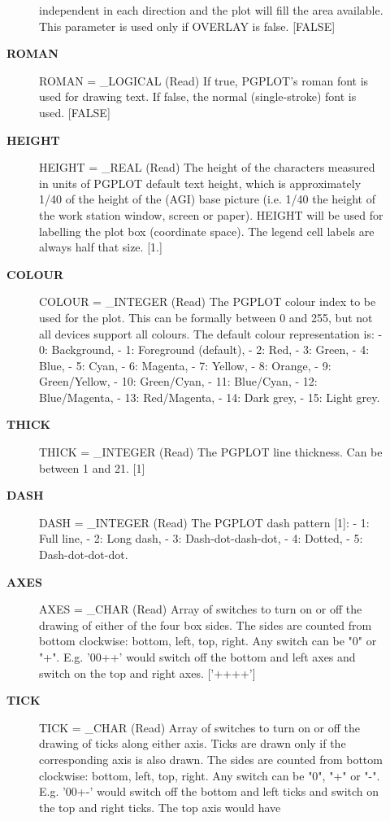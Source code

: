 \begin{description}
\begin{description}
   independent in each direction and the plot will fill the area
   available. This parameter is used only if OVERLAY is false. [FALSE]
\item [{\bf ROMAN}]
ROMAN = _LOGICAL (Read)
   If true, PGPLOT's roman font is used for drawing text. If
   false, the normal (single-stroke) font is used. [FALSE]
\item [{\bf HEIGHT}]
HEIGHT = _REAL (Read)
   The height of the characters measured in units of PGPLOT
   default text height, which is approximately 1/40 of the height
   of the (AGI) base picture (i.e. 1/40 the height of the
   work station window, screen or paper). HEIGHT will be used for
   labelling the plot box (coordinate space). The legend cell
   labels are always half that size. [1.]
\item [{\bf COLOUR}]
COLOUR = _INTEGER (Read)
   The PGPLOT colour index to be used for the plot. This can be
   formally between 0 and 255, but not all devices support all
   colours. The default colour representation is:
   -  0: Background,           -  1: Foreground (default),
   -  2: Red,                  -  3: Green,
   -  4: Blue,                 -  5: Cyan,
   -  6: Magenta,              -  7: Yellow,
   -  8: Orange,               -  9: Green/Yellow,
   - 10: Green/Cyan,           - 11: Blue/Cyan,
   - 12: Blue/Magenta,         - 13: Red/Magenta,
   - 14: Dark grey,            - 15: Light grey.
\item [{\bf THICK}]
THICK = _INTEGER (Read)
   The PGPLOT line thickness. Can be between 1 and 21. [1]
\item [{\bf DASH}]
DASH = _INTEGER (Read)
   The PGPLOT dash pattern [1]:
   -  1: Full line,
   -  2: Long dash,
   -  3: Dash-dot-dash-dot,
   -  4: Dotted,
   -  5: Dash-dot-dot-dot.
\item [{\bf AXES}]
AXES = _CHAR (Read)
   Array of switches to turn on or off the drawing of either of
   the four box sides. The sides are counted from bottom
   clockwise: bottom, left, top, right. Any switch can be "0" or
   "+". E.g. '00++' would switch off the bottom and left axes and
   switch on the top and right axes. ['++++']
\item [{\bf TICK}]
TICK = _CHAR (Read)
   Array of switches to turn on or off the drawing of ticks along
   either axis. Ticks are drawn only if the corresponding axis is
   also drawn. The sides are counted from bottom clockwise:
   bottom, left, top, right. Any switch can be "0", "+" or
   "-". E.g. '00+-' would switch off the bottom and left ticks and
   switch on the top and right ticks. The top axis would have

\end{description}
\end{description}
